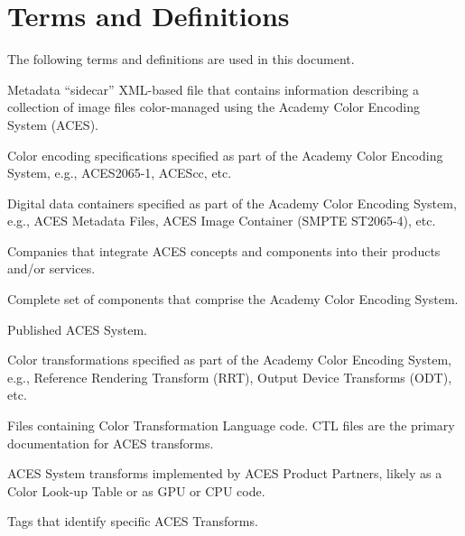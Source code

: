 \numberedformat
\chapter{Terms and Definitions}
The following terms and definitions are used in this document.

Metadata “sidecar” XML-based file that contains information describing a collection of image files color-managed using the Academy Color Encoding System (ACES).

Color encoding specifications specified as part of the Academy Color Encoding System, e.g., ACES2065-1, ACEScc, etc.

Digital data containers specified as part of the Academy Color Encoding System, e.g., ACES Metadata Files, ACES Image Container (SMPTE ST2065-4), etc.

Companies that integrate ACES concepts and components into their products and/or services.

Complete set of components that comprise the Academy Color Encoding System.

Published ACES System.

Color transformations specified as part of the Academy Color Encoding System, e.g., Reference Rendering Transform (RRT), Output Device Transforms (ODT), etc.

Files containing Color Transformation Language code. CTL files are the primary documentation for ACES transforms.

ACES System transforms implemented by ACES Product Partners, likely as a Color Look-up Table or as GPU or CPU code.

Tags that identify specific ACES Transforms.